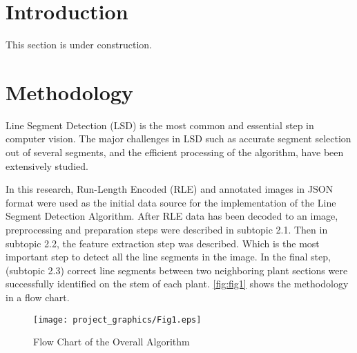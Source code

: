 \documentclass[]{iat}
\begin{document}
	\graphicspath{{./project_graphics/}}


\pagestyle{iat}
\tableofcontents
\chapter{Introduction}
\setcounter{page}{1}
\par
This section is under construction. 
\par
\chapter{Methodology}
Line Segment Detection (LSD) is the most common and essential step in computer vision. The major challenges in LSD such as accurate segment selection out of several segments, and the efficient processing of the algorithm, have been extensively studied.
\par
In this research, Run-Length Encoded (RLE) and annotated images in JSON format were used as the initial data source for the implementation of the Line Segment Detection Algorithm. After RLE data has been decoded to an image, preprocessing and preparation steps were described in subtopic 2.1. Then in subtopic 2.2, the feature extraction step was described. Which is the most important step to detect all the line segments in the image. In the final step, (subtopic 2.3) correct line segments between two neighboring plant sections were successfully identified on the stem of each plant. \autoref{fig:fig1} shows the methodology in a flow chart.

\FloatBarrier
\begin{figure}[h]
    
	\texttt{[image: project\_graphics/Fig1.eps]}
	\caption{Flow Chart of the Overall Algorithm }
	\label{fig:fig1}
\end{figure}
\end{document}
